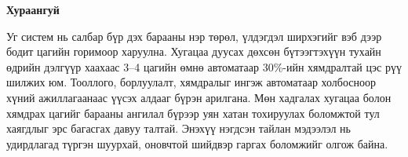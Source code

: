 

\begin{center}
{\scshape\Large \univname\par} %
{\scshape\large \facname\par}\vspace{0.5cm} %
{\huge\textbf{{Хураангуй}} \par}
\bigskip
{\Large{\ttitle} \par} %
\bigskip

{\normalsize \shortname \par} %
\addressname
\end{center}

\qquad
Уг систем нь салбар бүр дэх барааны нэр төрөл, үлдэгдэл ширхэгийг вэб дээр бодит цагийн горимоор харуулна. Хугацаа дуусах дөхсөн бүтээгтэхүүн тухайн өдрийн дэлгүүр хаахаас 3–4 цагийн өмнө автоматаар 30\%-ийн хямдралтай цэс рүү шилжих юм. Тооллого, борлуулалт, хямдралыг ингэж автоматаар холбосноор хүний ажиллагаанаас үүсэх алдааг бүрэн арилгана. Мөн хадгалах хугацаа болон хямдрах цагийг барааны ангилал бүрээр уян хатан тохируулах боломжтой тул хаягдлыг эрс багасгах давуу талтай. Энэхүү нэгдсэн тайлан мэдээлэл нь удирдлагад түргэн шуурхай, оновчтой шийдвэр гаргах боломжийг олгож байна.